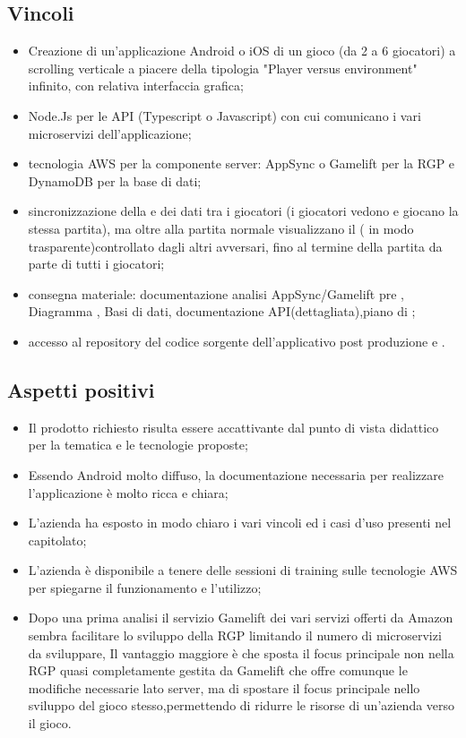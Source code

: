 \subsection{Vincoli}
\begin{itemize}
\item Creazione di un'applicazione Android o iOS di un gioco (da 2 a 6 giocatori) a scrolling verticale a piacere della tipologia "Player versus environment" infinito, con relativa interfaccia grafica;
\item Node.Js per le API (Typescript o Javascript) con cui comunicano i vari microservizi dell'applicazione;
\item tecnologia AWS per la componente server: AppSync o Gamelift per la RGP e DynamoDB per la base di dati;    
\item sincronizzazione della e dei dati tra i giocatori (i giocatori vedono e giocano la stessa partita), ma oltre alla partita normale visualizzano il ( in modo trasparente)controllato dagli altri avversari, fino al termine della partita da parte di tutti i giocatori;
\item consegna materiale: documentazione analisi AppSync/Gamelift pre , Diagramma  , Basi di dati, documentazione API(dettagliata),piano di ;
\item accesso al repository del codice sorgente dell'applicativo post produzione e  .
\end{itemize}

\subsection{Aspetti positivi}
\begin{itemize}
\item Il prodotto richiesto risulta essere accattivante dal punto di vista didattico per la tematica e le tecnologie proposte;
\item Essendo Android molto diffuso, la documentazione necessaria per realizzare l'applicazione è molto ricca e chiara;
\item L'azienda ha esposto in modo chiaro i vari vincoli ed i casi d'uso presenti nel capitolato;
\item L'azienda \`e disponibile a tenere delle sessioni di training sulle tecnologie AWS per spiegarne il funzionamento e l'utilizzo;
\item Dopo una prima analisi il servizio Gamelift dei vari servizi offerti da Amazon sembra facilitare lo sviluppo della RGP limitando il numero di microservizi da sviluppare, Il vantaggio maggiore è che sposta il focus principale non nella RGP quasi completamente gestita da Gamelift che offre comunque le modifiche necessarie lato server, ma di spostare il focus principale nello sviluppo del gioco stesso,permettendo di ridurre le risorse  di un’azienda verso il gioco.
\end{itemize}
